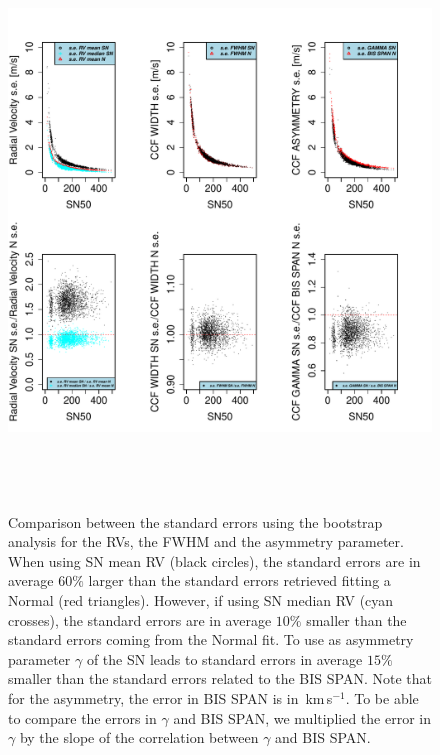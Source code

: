 \documentclass{aa}
\def\kms{\hbox{\,km\,s$^{-1}$}}       %
\begin{document}
%
\begin{figure}[htbp]
   \centering
\includegraphics[height = 6in]{[5]Errors_vs_SNR_all_stars.pdf} 
   \caption{Comparison between the standard errors using the bootstrap analysis for the RVs, the FWHM and the asymmetry parameter. When using SN mean RV (black circles), the standard errors are in average $60\%$ larger than the standard errors retrieved fitting a Normal (red triangles). However, if using SN median RV (cyan crosses), the standard errors are in average $10\%$ smaller than the standard errors coming from the Normal fit. To use as asymmetry parameter $\gamma$ of the SN leads to standard errors in average $15\%$ smaller than the standard errors related to the BIS SPAN. Note that for the asymmetry, the error in BIS SPAN is in \kms. To be able to compare the errors in $\gamma$ and BIS SPAN, we multiplied the error in $\gamma$ by the slope of the correlation between $\gamma$ and BIS SPAN.}
   \label{fig:se}
\end{figure}
\end{document}
